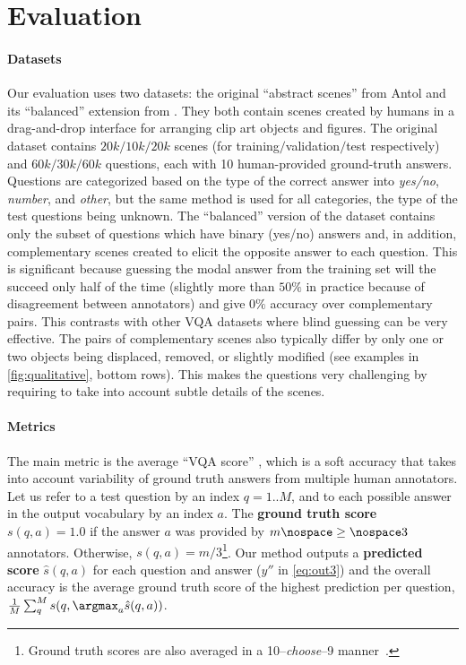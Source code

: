 \section{Evaluation}
\label{sec:evaluation}

\paragraph{Datasets}
Our evaluation uses two datasets: the original ``abstract scenes'' from Antol \etal \cite{antol2015vqa} and its ``balanced'' extension from \cite{zhang2015balanced}. They both contain scenes created by humans in a drag-and-drop interface for arranging clip art objects and figures. The original dataset contains $20k/10k/20k$ scenes (for training$/$validation$/$test respectively) and $60k/30k/60k$ questions, each with 10 human-provided ground-truth answers. Questions are categorized based on the type of the correct answer into \textit{yes/no}, \textit{number}, and \textit{other}, but the same method is used for all categories, the type of the test questions being unknown. The ``balanced'' version of the dataset contains only the subset of questions which have binary (yes/no) answers and, in addition, complementary scenes created to elicit the opposite answer to each question. This is significant because guessing the modal answer from the training set will the succeed only half of the time (slightly more than $50\%$ in practice because of disagreement between annotators) and give $0\%$ accuracy over complementary pairs. This contrasts with other VQA datasets where blind guessing can be very effective. The pairs of complementary scenes also typically differ by only one or two objects being displaced, removed, or slightly modified (see examples in \fig\ref{fig:qualitative}, bottom rows). This makes the questions very challenging by requiring to take into account subtle details of the scenes.

\paragraph{Metrics}
The main metric is the average ``VQA score'' \cite{antol2015vqa}, which is a soft accuracy that takes into account variability of ground truth answers from multiple human annotators. Let us refer to a test question by an index $q=1..M$, and to each possible answer in the output vocabulary by an index $a$. The \textbf{ground truth score} $s(q,a)=1.0$ if the answer $a$ was provided by $m\nospace\geq\nospace3$ annotators. Otherwise, $s(q,a)=m/3$\footnote{Ground truth scores are also averaged in a 10--\textit{choose}--9 manner~\cite{antol2015vqa}.}. Our method outputs a \textbf{predicted score} $\hat{s}(q,a)$ for each question and answer ($y''$ in \eq\ref{eq:out3}) and the overall accuracy is the average ground truth score of the highest prediction per question, \ie $\frac{1}{M} \sum_q^{M} s(q,\argmax_a \hat{s}(q,a) )$.

